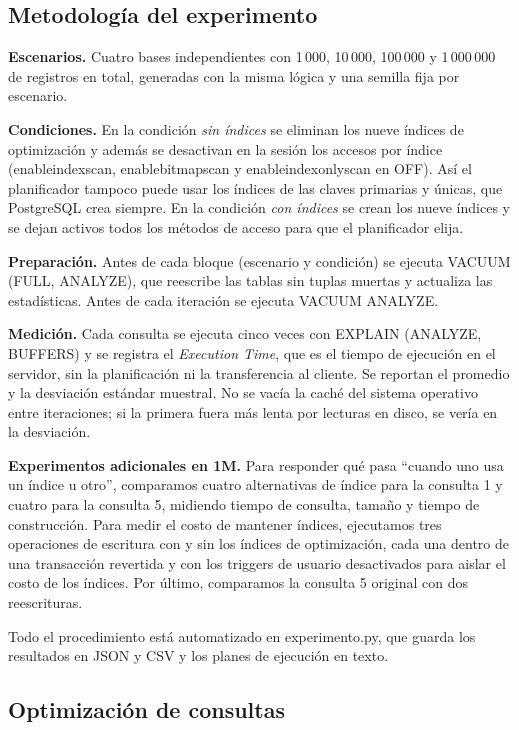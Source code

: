 \documentclass[11pt,letterpaper]{article}
\newcommand{\tbus}{\textunderscore\allowbreak}
\newcommand{\tb}[1]{{\ttfamily\let\_\tbus #1}}
\begin{document}
\subsection{Metodología del experimento}
\label{sec:metodologia}

\textbf{Escenarios.} Cuatro bases independientes con 1\,000, 10\,000, 100\,000 y 1\,000\,000 de registros en total, generadas con la misma lógica y una semilla fija por escenario.

\textbf{Condiciones.} En la condición \emph{sin índices} se eliminan los nueve índices de optimización y además se desactivan en la sesión los accesos por índice (\tb{enable\_indexscan}, \tb{enable\_bitmapscan} y \tb{enable\_indexonlyscan} en \tb{OFF}). Así el planificador tampoco puede usar los índices de las claves primarias y únicas, que PostgreSQL crea siempre. En la condición \emph{con índices} se crean los nueve índices y se dejan activos todos los métodos de acceso para que el planificador elija.

\textbf{Preparación.} Antes de cada bloque (escenario y condición) se ejecuta \tb{VACUUM (FULL, ANALYZE)}, que reescribe las tablas sin tuplas muertas y actualiza las estadísticas. Antes de cada iteración se ejecuta \tb{VACUUM ANALYZE}.

\textbf{Medición.} Cada consulta se ejecuta cinco veces con \tb{EXPLAIN (ANALYZE, BUFFERS)} y se registra el \emph{Execution Time}, que es el tiempo de ejecución en el servidor, sin la planificación ni la transferencia al cliente. Se reportan el promedio y la desviación estándar muestral. No se vacía la caché del sistema operativo entre iteraciones; si la primera fuera más lenta por lecturas en disco, se vería en la desviación.

\textbf{Experimentos adicionales en 1M.} Para responder qué pasa ``cuando uno usa un índice u otro'', comparamos cuatro alternativas de índice para la consulta 1 y cuatro para la consulta 5, midiendo tiempo de consulta, tamaño y tiempo de construcción. Para medir el costo de mantener índices, ejecutamos tres operaciones de escritura con y sin los índices de optimización, cada una dentro de una transacción revertida y con los triggers de usuario desactivados para aislar el costo de los índices. Por último, comparamos la consulta 5 original con dos reescrituras.

Todo el procedimiento está automatizado en \tb{experimento.py}, que guarda los resultados en JSON y CSV y los planes de ejecución en texto.

\subsection{Optimización de consultas}
\end{document}
